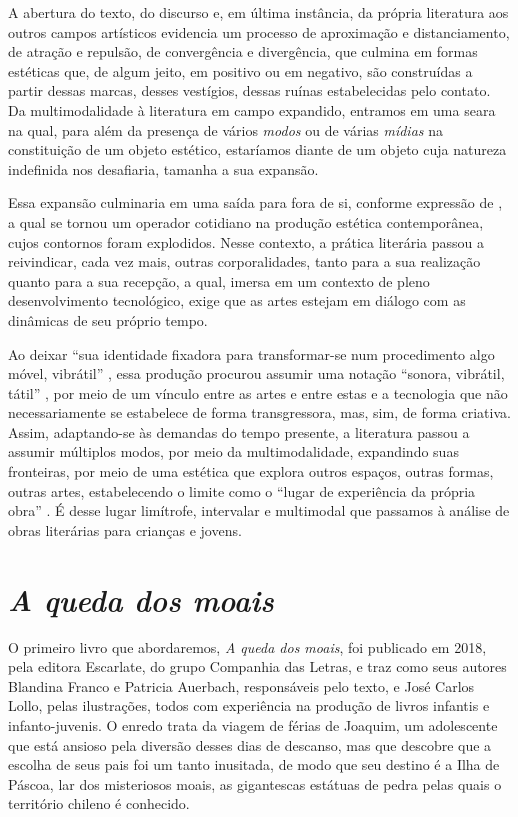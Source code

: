 \documentclass[portuguese]{textolivre}
\begin{document}
A abertura do texto, do discurso e, em última instância, da própria literatura
aos outros campos artísticos evidencia um processo de aproximação e
distanciamento, de atração e repulsão, de convergência e divergência, que
culmina em formas estéticas que, de algum jeito, em positivo ou em negativo,
são construídas a partir dessas marcas, desses vestígios, dessas ruínas
estabelecidas pelo contato. Da multimodalidade à literatura em campo expandido,
entramos em uma seara na qual, para além da presença de vários \textit{modos}
ou de várias \textit{mídias} na constituição de um objeto estético, estaríamos
diante de um objeto cuja natureza indefinida nos desafiaria, tamanha a sua
expansão.

Essa expansão culminaria em uma saída para fora de si, conforme expressão de
\textcite{kiffer_2014}, a qual se tornou um operador cotidiano na produção
estética contemporânea, cujos contornos foram explodidos. Nesse contexto, a
prática literária passou a reivindicar, cada vez mais, outras corporalidades,
tanto para a sua realização quanto para a sua recepção, a qual, imersa em um
contexto de pleno desenvolvimento tecnológico, exige que as artes estejam em
diálogo com as dinâmicas de seu próprio tempo. 

Ao deixar “sua identidade fixadora para transformar-se num procedimento algo
móvel, vibrátil” \cite[p.~55]{kiffer_2014}, essa produção procurou assumir uma
notação “sonora, vibrátil, tátil” \cite[p.~54]{kiffer_2014}, por meio de um
vínculo entre as artes e entre estas e a tecnologia que não necessariamente se
estabelece de forma transgressora, mas, sim, de forma criativa. Assim,
adaptando-se às demandas do tempo presente, a literatura passou a assumir
múltiplos modos, por meio da multimodalidade, expandindo suas fronteiras, por
meio de uma estética que explora outros espaços, outras formas, outras artes,
estabelecendo o limite como o “lugar de experiência da própria obra”
\cite[p.~13]{kiffer_Garramuno_2014}. É desse lugar limítrofe, intervalar e
multimodal que passamos à análise de obras literárias para crianças e jovens.

\section{\textit{A queda dos moais}}\label{sec-conduta}

O primeiro livro que abordaremos, \textit{A queda dos moais}, foi publicado em 2018,
pela editora Escarlate, do grupo Companhia das Letras, e traz como seus autores
Blandina Franco e Patricia Auerbach, responsáveis pelo texto, e José Carlos
Lollo, pelas ilustrações, todos com experiência na produção de livros infantis
e infanto-juvenis. O enredo trata da viagem de férias de Joaquim, um
adolescente que está ansioso pela diversão desses dias de descanso, mas que
descobre que a escolha de seus pais foi um tanto inusitada, de modo que seu
destino é a Ilha de Páscoa, lar dos misteriosos moais, as gigantescas estátuas
de pedra pelas quais o território chileno é conhecido.
\end{document}
